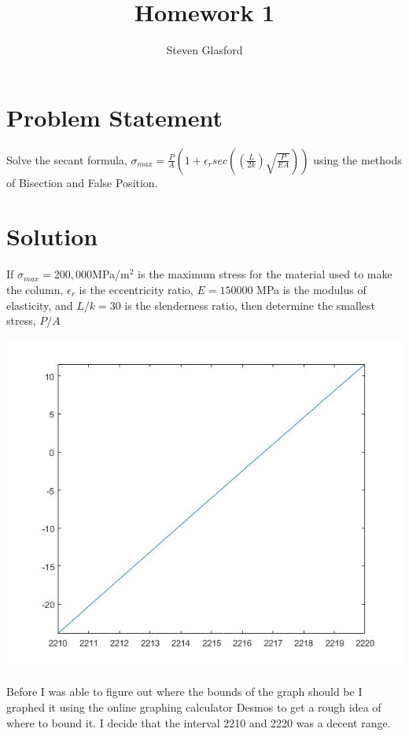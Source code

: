 \documentclass[11pt]{article}
\title{Homework 1}
\author{Steven Glasford}
\date{\parbox{\linewidth}{\centering%
    \today\endgraf\medskip
    Numerical Analysis\endgraf\medskip
    MATH-373}}
\begin{document}
\maketitle
\pagebreak

\section{Problem Statement}
Solve the secant formula, $\sigma_{max} = \frac{P}{A}\left(1+\epsilon_r sec \left( \left(\frac{L}{2k}\right)\sqrt{\frac{P}{EA}}\right)\right)$ using the methods of Bisection and False Position.
\section{Solution}

If $\sigma_{max} = 200,000 $MPa/m$^2$ is the maximum stress for the material used to make the column, $\epsilon_r$ is the eccentricity ratio, $E=150000$ MPa is the modulus of elasticity, and $L/k = 30$ is the slenderness ratio, then determine the smallest stress, $P/A$

\begin{center}
\includegraphics[scale=.5]{secant.jpg}
\end{center}
Before I was able to figure out where the bounds of the graph should be I graphed it using the online graphing calculator Desmos to get a rough idea of where to bound it. I decide that the interval 2210 and 2220 was a decent range.
\end{document}
